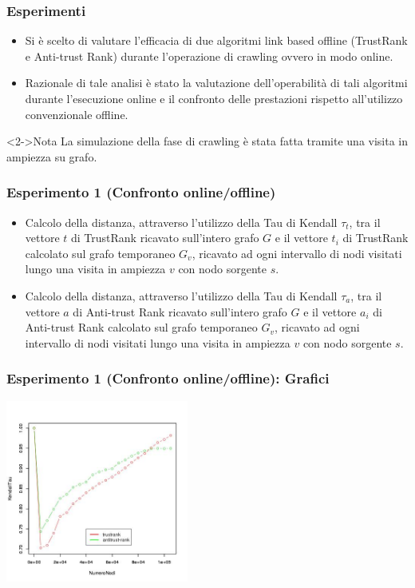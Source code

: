 \documentclass{beamer}
\begin{document}
\begin{frame}
  \frametitle{Esperimenti}
  \begin{itemize}
   \item Si è scelto di valutare l’efficacia di due algoritmi link based offline (TrustRank e Anti-trust Rank) durante l’operazione di crawling ovvero in modo online.
   \item Razionale di tale analisi è stato la valutazione dell’operabilità di tali algoritmi durante l’esecuzione online e
il confronto delle prestazioni rispetto all’utilizzo convenzionale offline.
  \end{itemize}
  \begin{block}<2->{Nota}
   La simulazione della fase di crawling è stata fatta tramite una visita in ampiezza su grafo.
  \end{block}
\end{frame}
\begin{frame}
\frametitle{Esperimento 1 {\tiny(Confronto online/offline)}}
\begin{itemize}
 \item<1-> Calcolo della distanza, attraverso l’utilizzo della Tau di Kendall \(\tau_t\), tra il vettore \(t\) di TrustRank ricavato sull’intero grafo \(G\) e il vettore \(t_i\) di TrustRank calcolato sul grafo temporaneo \(G_v\), ricavato ad ogni intervallo di nodi visitati lungo una visita in ampiezza \(v\) con nodo sorgente \(s\).
 \item<2-> Calcolo della distanza, attraverso l’utilizzo della Tau di Kendall \(\tau_a\), tra il vettore \(a\) di Anti-trust Rank ricavato sull’intero grafo \(G\) e il vettore \(a_i\) di Anti-trust Rank calcolato sul grafo temporaneo \(G_v\), ricavato ad ogni intervallo di nodi visitati lungo una visita in ampiezza \(v\) con nodo sorgente \(s\).
\end{itemize}
\end{frame}
\begin{frame}
\frametitle{Esperimento 1 {\tiny(Confronto online/offline)}: Grafici}
\begin{center}
 \includegraphics[height=6cm]{immagini/test1/coplotTrustAnti_62}
\end{center}
\end{frame}
\end{document}
